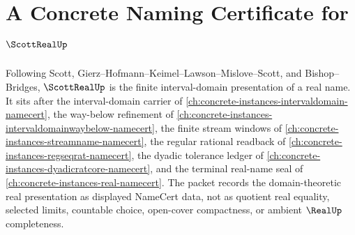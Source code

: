\chapter{A Concrete Naming Certificate for $\ScottRealUp$}
\label{ch:concrete-instances-scott-real-namecert}

Following Scott, Gierz--Hofmann--Keimel--Lawson--Mislove--Scott, and Bishop--Bridges, $\ScottRealUp$ is the finite interval-domain presentation of a real name. It sits after the interval-domain carrier of \autoref{ch:concrete-instances-intervaldomain-namecert}, the way-below refinement of \autoref{ch:concrete-instances-intervaldomainwaybelow-namecert}, the finite stream windows of \autoref{ch:concrete-instances-streamname-namecert}, the regular rational readback of \autoref{ch:concrete-instances-regseqrat-namecert}, the dyadic tolerance ledger of \autoref{ch:concrete-instances-dyadicratcore-namecert}, and the terminal real-name seal of \autoref{ch:concrete-instances-real-namecert}. The packet records the domain-theoretic real presentation as displayed NameCert data, not as quotient real equality, selected limits, countable choice, open-cover compactness, or ambient $\RealUp$ completeness.

